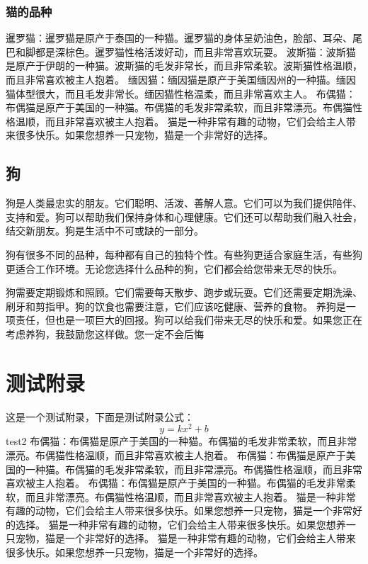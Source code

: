 \documentclass[engineeringmaster]{hquThesis}
\begin{document}
\subsection{猫的品种}
暹罗猫：暹罗猫是原产于泰国的一种猫。暹罗猫的身体呈奶油色，脸部、耳朵、尾巴和脚都是深棕色。暹罗猫性格活泼好动，而且非常喜欢玩耍。
波斯猫：波斯猫是原产于伊朗的一种猫。波斯猫的毛发非常长，而且非常柔软。波斯猫性格温顺，而且非常喜欢被主人抱着。
缅因猫：缅因猫是原产于美国缅因州的一种猫。缅因猫体型很大，而且毛发非常长。缅因猫性格温柔，而且非常喜欢主人。
布偶猫：布偶猫是原产于美国的一种猫。布偶猫的毛发非常柔软，而且非常漂亮。布偶猫性格温顺，而且非常喜欢被主人抱着。
猫是一种非常有趣的动物，它们会给主人带来很多快乐。如果您想养一只宠物，猫是一个非常好的选择。

\section{狗}
狗是人类最忠实的朋友。它们聪明、活泼、善解人意。它们可以为我们提供陪伴、支持和爱。狗可以帮助我们保持身体和心理健康。它们还可以帮助我们融入社会，结交新朋友。狗是生活中不可或缺的一部分\cite{Wu2016}。

狗有很多不同的品种，每种都有自己的独特个性。有些狗更适合家庭生活，有些狗更适合工作环境。无论您选择什么品种的狗，它们都会给您带来无尽的快乐\cite{du2022}。

狗需要定期锻炼和照顾。它们需要每天散步、跑步或玩耍。它们还需要定期洗澡、刷牙和剪指甲。狗的饮食也需要注意，它们应该吃健康、营养的食物\cite{Wu2016}。
养狗是一项责任，但也是一项巨大的回报。狗可以给我们带来无尽的快乐和爱。如果您正在考虑养狗，我鼓励您这样做。您一定不会后悔



\appendix

\chapter{测试附录}
这是一个测试附录，下面是测试附录公式：
\begin{equation}
y = kx^2 + b
\end{equation}
test2
布偶猫：布偶猫是原产于美国的一种猫。布偶猫的毛发非常柔软，而且非常漂亮。布偶猫性格温顺，而且非常喜欢被主人抱着。
布偶猫：布偶猫是原产于美国的一种猫。布偶猫的毛发非常柔软，而且非常漂亮。布偶猫性格温顺，而且非常喜欢被主人抱着。
布偶猫：布偶猫是原产于美国的一种猫。布偶猫的毛发非常柔软，而且非常漂亮。布偶猫性格温顺，而且非常喜欢被主人抱着。
猫是一种非常有趣的动物，它们会给主人带来很多快乐。如果您想养一只宠物，猫是一个非常好的选择。
猫是一种非常有趣的动物，它们会给主人带来很多快乐。如果您想养一只宠物，猫是一个非常好的选择。
猫是一种非常有趣的动物，它们会给主人带来很多快乐。如果您想养一只宠物，猫是一个非常好的选择。
\end{document}
